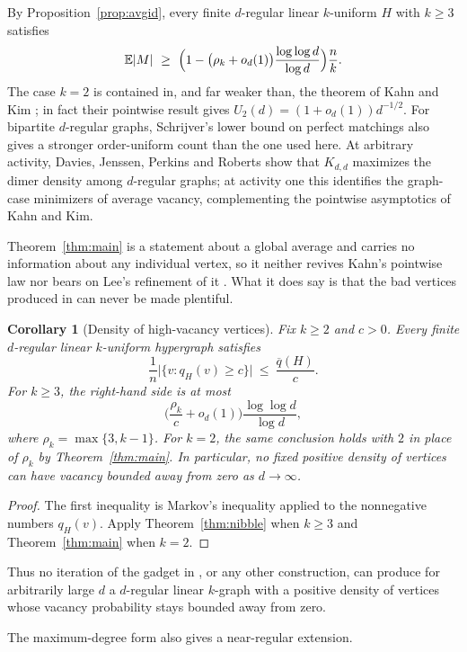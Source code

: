 \documentclass[11pt,a4paper]{amsart}
\theoremstyle{plain}
\newtheorem{corollary}[theorem]{Corollary}
\theoremstyle{definition}
\theoremstyle{remark}
\newcommand{\EX}{\mathbb{E}}
\newcommand{\qbar}{\overline{q}}
\begin{document}
By Proposition~\ref{prop:avgid}, every finite $d$-regular linear $k$-uniform $H$ with
$k\ge3$ satisfies
\[
  \EX|M|\ \ge\ \Bigl(1-\bigl(\rho_k+o_d(1)\bigr)
  \frac{\log\log d}{\log d}\Bigr)\frac{n}{k}.
\]
The case $k=2$ is contained in, and far weaker than, the theorem of Kahn and Kim
\cite{KahnKim98}; in fact their pointwise result gives
$U_2(d)=(1+o_d(1))d^{-1/2}$. For bipartite $d$-regular graphs, Schrijver's lower bound on perfect
matchings \cite{Schrijver} also gives a stronger order-uniform count than the one used
here. At arbitrary activity, Davies, Jenssen, Perkins and Roberts \cite{DJPR} show that
$K_{d,d}$ maximizes the dimer density among $d$-regular graphs; at activity one this
identifies the graph-case minimizers of average vacancy, complementing the pointwise
asymptotics of Kahn and Kim.

Theorem~\ref{thm:main} is a statement about a global average and carries no information
about any individual vertex, so it neither revives Kahn's pointwise law nor bears on Lee's
refinement of it \cite[Conjecture 5.2]{Lee}. What it does say is that the bad vertices
produced in \cite{Lee} can never be made plentiful.

\begin{corollary}[Density of high-vacancy vertices]
\label{cor:nodensity}
Fix $k\ge2$ and $c>0$. Every finite $d$-regular linear $k$-uniform hypergraph satisfies
\[
  \frac1n\bigl|\{v:q_H(v)\ge c\}\bigr|
  \ \le\ \frac{\qbar(H)}c.
\]
For $k\ge3$, the right-hand side is at most
\[
  \biggl(\frac{\rho_k}{c}+o_d(1)\biggr)
       \frac{\log\log d}{\log d},
\]
where $\rho_k=\max\{3,k-1\}$. For $k=2$, the same conclusion holds with $2$ in
place of $\rho_k$ by Theorem~\ref{thm:main}. In particular, no fixed positive density
of vertices can have vacancy bounded away from zero as $d\to\infty$.
\end{corollary}

\begin{proof}
The first inequality is Markov's inequality applied to the nonnegative numbers $q_H(v)$.
Apply Theorem~\ref{thm:nibble} when $k\ge3$ and Theorem~\ref{thm:main} when $k=2$.
\end{proof}

Thus no iteration of the gadget in \cite[\S2]{Lee}, or any other construction, can
produce for arbitrarily large $d$ a $d$-regular linear $k$-graph with a positive density
of vertices whose vacancy probability stays bounded away from zero.

The maximum-degree form also gives a near-regular extension.
\end{document}
